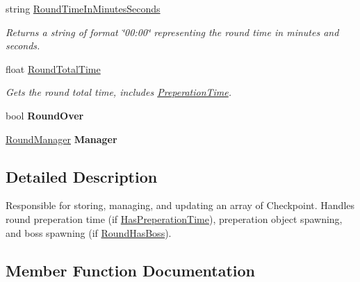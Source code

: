 \begin{DoxyCompactItemize}
string \hyperlink{class_round_manager_1_1_round_a04a73d6f8ba0ffb7191ae66723691cdd}{Round\+Time\+In\+Minutes\+Seconds}
\begin{DoxyCompactList}\small\item\em Returns a string of format \char`\"{}00\+:00\char`\"{} representing the round time in minutes and seconds. \end{DoxyCompactList}\item 
float \hyperlink{class_round_manager_1_1_round_acf43ece0f30f65cadc87fd0f0ce845ea}{Round\+Total\+Time}
\begin{DoxyCompactList}\small\item\em Gets the round total time, includes \hyperlink{class_round_manager_1_1_round_a5a70ef04a60e0aeddaf1cd1898a419e5}{Preperation\+Time}. \end{DoxyCompactList}\item 
\hypertarget{class_round_manager_1_1_round_a28b27affc0096795a58334d8df899976}{}bool {\bfseries Round\+Over}\label{class_round_manager_1_1_round_a28b27affc0096795a58334d8df899976}

\item 
\hypertarget{class_round_manager_1_1_round_a0124a9c0c7b4a57d75c9244503f3beaa}{}\hyperlink{class_round_manager_1_1_round_manager}{Round\+Manager} {\bfseries Manager}\label{class_round_manager_1_1_round_a0124a9c0c7b4a57d75c9244503f3beaa}

\end{DoxyCompactItemize}


\subsection{Detailed Description}
Responsible for storing, managing, and updating an array of Checkpoint. Handles round preperation time (if \hyperlink{class_round_manager_1_1_round_a711e1825e6d269ab0308a79cf25ee8d1}{Has\+Preperation\+Time}), preperation object spawning, and boss spawning (if \hyperlink{class_round_manager_1_1_round_a3e8205a74f196546906314f802f41127}{Round\+Has\+Boss}). 



\subsection{Member Function Documentation}
\hypertarget{class_round_manager_1_1_round_a8b60989ebf80e7497984efb956ef9a14}{}
